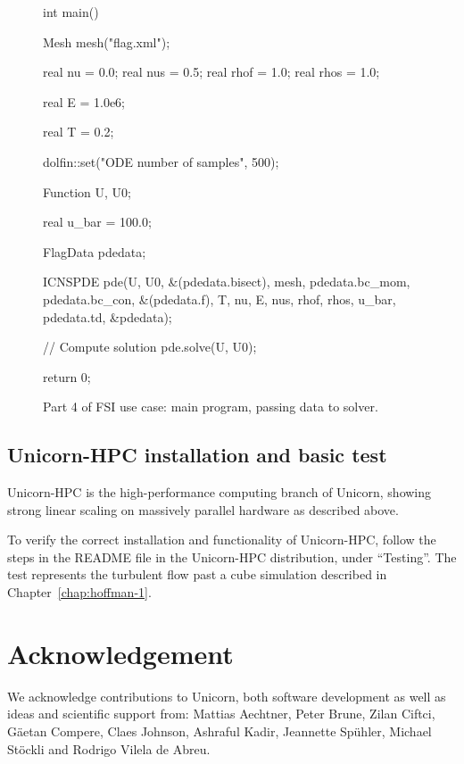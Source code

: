 \begin{figure}
\begin{c++}
int main()
{
  Mesh mesh("flag.xml");

  real nu = 0.0;
  real nus = 0.5;
  real rhof = 1.0;
  real rhos = 1.0;

  real E = 1.0e6;

  real T = 0.2;

  dolfin::set("ODE number of samples", 500);

  Function U, U0;

  real u_bar = 100.0;

  FlagData pdedata;

  ICNSPDE pde(U, U0, &(pdedata.bisect), mesh,
	      pdedata.bc_mom, pdedata.bc_con,
	      &(pdedata.f), T, nu, E, nus, rhof, rhos,
	      u_bar, pdedata.td, &pdedata);

  // Compute solution
  pde.solve(U, U0);

  return 0;
}
\end{c++}
\caption{Part 4 of FSI use case: main program, passing data to solver.}
\end{figure}

\subsection{Unicorn-HPC installation and basic test}

Unicorn-HPC is the high-performance computing branch of Unicorn, showing
strong linear scaling on massively parallel hardware as described above.

To verify the correct installation and functionality of Unicorn-HPC,
follow the steps in the README file in the Unicorn-HPC distribution,
under ``Testing''. The test represents the turbulent flow past a cube
simulation described in Chapter~\ref{chap:hoffman-1}.

\section{Acknowledgement}

We acknowledge contributions to Unicorn, both software development
as well as ideas and scientific support from: Mattias Aechtner, Peter
Brune, Zilan Ciftci, G\"aetan Compere, Claes Johnson, Ashraful Kadir,
Jeannette Sp\"uhler, Michael St\"ockli and Rodrigo Vilela de Abreu.
